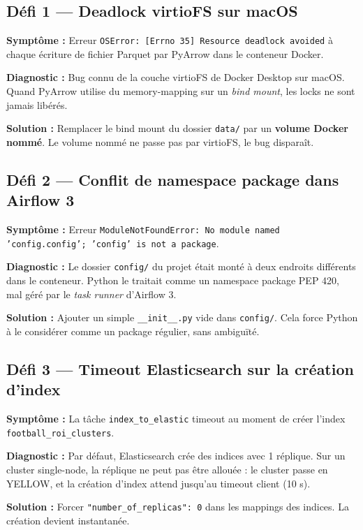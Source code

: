 \documentclass[11pt,a4paper]{article}
\begin{document}
\subsection*{Défi 1 — Deadlock virtioFS sur macOS}

\textbf{Symptôme :} Erreur \texttt{OSError: [Errno 35] Resource deadlock
avoided} à chaque écriture de fichier Parquet par PyArrow dans le conteneur Docker.

\textbf{Diagnostic :} Bug connu de la couche virtioFS de Docker Desktop sur
macOS. Quand PyArrow utilise du memory-mapping sur un \textit{bind mount}, les
locks ne sont jamais libérés.

\textbf{Solution :} Remplacer le bind mount du dossier \texttt{data/} par un
\textbf{volume Docker nommé}. Le volume nommé ne passe pas par virtioFS, le
bug disparaît.

\subsection*{Défi 2 — Conflit de namespace package dans Airflow 3}

\textbf{Symptôme :} Erreur \texttt{ModuleNotFoundError: No module named
'config.config'; 'config' is not a package}.

\textbf{Diagnostic :} Le dossier \texttt{config/} du projet était monté à deux
endroits différents dans le conteneur. Python le traitait comme un namespace
package PEP 420, mal géré par le \textit{task runner} d'Airflow 3.

\textbf{Solution :} Ajouter un simple \texttt{\_\_init\_\_.py} vide dans
\texttt{config/}. Cela force Python à le considérer comme un package régulier,
sans ambiguïté.

\subsection*{Défi 3 — Timeout Elasticsearch sur la création d'index}

\textbf{Symptôme :} La tâche \texttt{index\_to\_elastic} timeout au moment de
créer l'index \texttt{football\_roi\_clusters}.

\textbf{Diagnostic :} Par défaut, Elasticsearch crée des indices avec 1 réplique.
Sur un cluster single-node, la réplique ne peut pas être allouée : le cluster
passe en YELLOW, et la création d'index attend jusqu'au timeout client (10 s).

\textbf{Solution :} Forcer \texttt{"number\_of\_replicas": 0} dans les mappings
des indices. La création devient instantanée.
\end{document}
